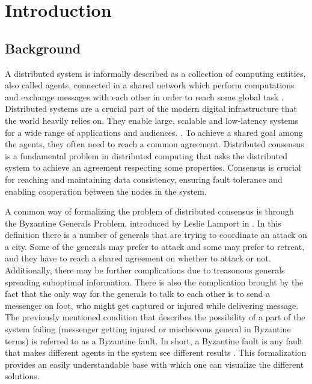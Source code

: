 \section{Introduction}
\thispagestyle{empty}

\subsection{Background}
A distributed system is informally described as a collection of computing entities, also called agents, connected in a shared network which perform computations and exchange messages with each other in order to reach some global task \cite{Coulouris_systems_2005}. Distributed systems are a crucial part of the modern digital infrastructure that the world heavily relies on. They enable large, scalable and low-latency systems for a wide range of applications and audiences. . To achieve a shared goal among the agents, they often need to reach a common agreement.  Distributed consensus is a fundamental problem in distributed computing that asks the distributed system to achieve an agreement respecting some properties. Consensus is crucial for reaching and maintaining data consistency, ensuring fault tolerance and enabling cooperation between the nodes in the system. 

A common way of formalizing the problem of distributed consensus is through the Byzantine Generals Problem, introduced by Leslie Lamport in \cite{lamportByzantineGeneralsProblem}. In this definition there is a number of generals that are trying to coordinate an attack on a city. Some of the generals may prefer to attack and some may prefer to retreat, and they have to reach a shared agreement on whether to attack or not. Additionally, there may be further complications due to treasonous generals spreading suboptimal information. There is also the complication brought by the fact that the only way for the generals to talk to each other is to send a messenger on foot, who might get captured or injured while delivering message. 
The previously mentioned condition that describes the possibility of a part of the system failing (messenger getting injured or mischievous general in Byzantine terms) is referred to as a Byzantine fault. In short, a Byzantine fault is any fault that makes different agents in the system see different results \cite{driscollRealByzantineGenerals2004}. 
This formalization provides an easily understandable base with which one can visualize the different solutions.

